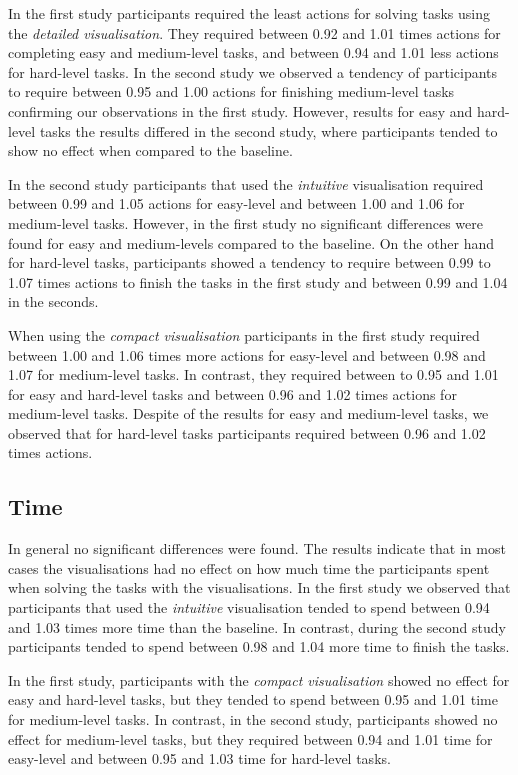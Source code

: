 \documentclass[final,5p,times,twocolumn,authoryear]{elsarticle}
\begin{document}
In the first study participants required the least actions for solving tasks using the \emph{detailed visualisation}. They required between 0.92 and 1.01 times actions for completing easy and medium-level tasks, and between 0.94 and 1.01 less actions for hard-level tasks. In the second study we observed a tendency of participants to require between 0.95 and 1.00 actions for finishing medium-level tasks confirming our observations in the first study. However, results for easy and hard-level tasks the results differed in the second study, where participants tended to show no effect when compared to the baseline. 

In the second study participants that used the \emph{intuitive} visualisation required between 0.99 and 1.05 actions for easy-level and between 1.00 and 1.06 for medium-level tasks. However, in the first study no significant differences were found for easy and medium-levels compared to the baseline. On the other hand for hard-level tasks, participants showed a tendency to require between 0.99 to 1.07 times actions to finish the tasks in the first study and between 0.99 and 1.04 in the seconds.

When using the \emph{compact visualisation} participants in the first study required between 1.00 and 1.06 times more actions for easy-level and between 0.98 and 1.07 for medium-level tasks. In contrast, they required between to 0.95 and 1.01 for easy and hard-level tasks and between 0.96 and 1.02 times actions for medium-level tasks. Despite of the results for easy and medium-level tasks, we observed that for hard-level tasks participants required between 0.96 and 1.02 times actions.



\subsection{Time}
In general no significant differences were found. The results indicate that in most cases the visualisations had no effect on how much time the participants spent when solving the tasks with the visualisations. In the first study we observed that participants that used the \emph{intuitive} visualisation tended to spend between 0.94 and 1.03 times more time than the baseline. In contrast, during the second study participants tended to spend between 0.98 and 1.04 more time to finish the tasks. 

In the first study, participants with the \emph{compact visualisation} showed no effect for easy and hard-level tasks, but they tended to spend between 0.95 and 1.01 time for medium-level tasks. In contrast, in the second study, participants showed no effect for medium-level tasks, but they required between 0.94 and 1.01 time for easy-level and between 0.95 and 1.03 time for hard-level tasks.
\end{document}
